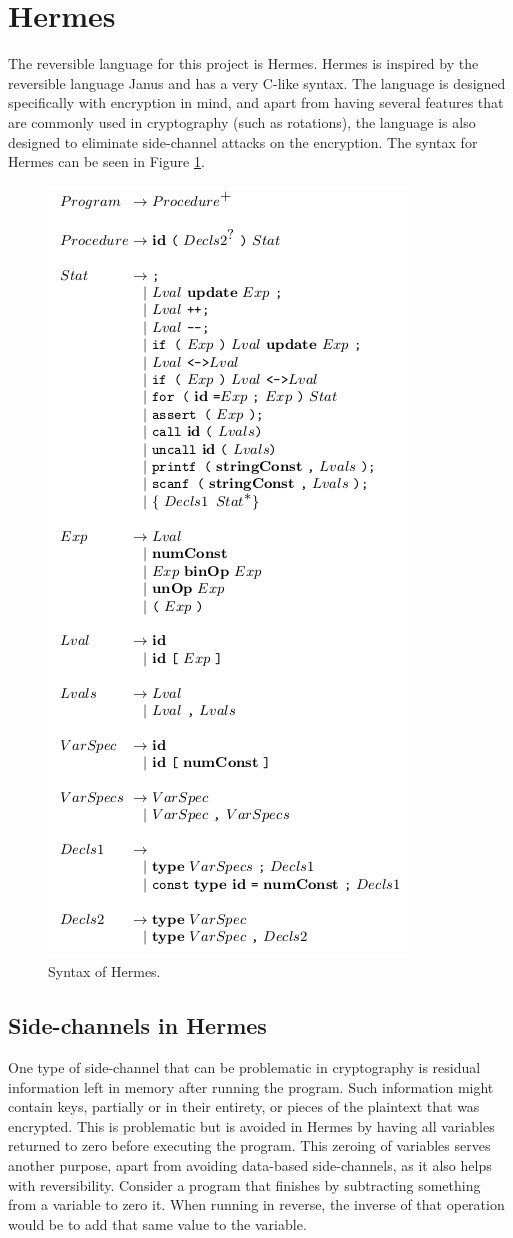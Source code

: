 \section{Hermes}
\label{Hermes}
The reversible language for this project is Hermes\cite{PSI19}. Hermes is inspired by the reversible language Janus and has a very C-like syntax. The language is designed specifically with encryption in mind, and apart from having several features that are commonly used in cryptography (such as rotations), the language is also designed to eliminate side-channel attacks on the encryption. The syntax for Hermes can be seen in Figure \ref{Hermes-syntax}.
\begin{figure}[h!] 
\centering 
\includegraphics[width=0.6\linewidth]{figures/syntax}
\caption{Syntax of Hermes.}
\label{Hermes-syntax}
\end{figure}
\subsection{Side-channels in Hermes}
One type of side-channel that can be problematic in cryptography is residual information left in memory after running the program. Such information might contain keys, partially or in their entirety, or pieces of the plaintext that was encrypted. This is problematic but is avoided in Hermes by having all variables returned to zero before executing the program. This zeroing of variables serves another purpose, apart from avoiding data-based side-channels, as it also helps with reversibility. Consider a program that finishes by subtracting something from a variable to zero it. When running in reverse, the inverse of that operation would be to add that same value to the variable. 

